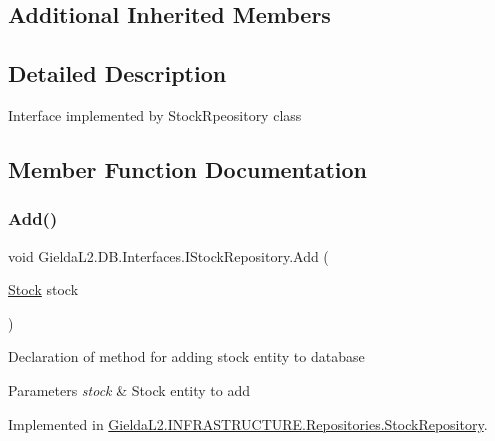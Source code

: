 \subsection*{Additional Inherited Members}


\subsection{Detailed Description}
Interface implemented by Stock\+Rpeository class 



\subsection{Member Function Documentation}
\mbox{\label{interface_gielda_l2_1_1_d_b_1_1_interfaces_1_1_i_stock_repository_a602e2dcb80b5c6e13e2db9ff57afa96b}} 
\subsubsection{\texorpdfstring{Add()}{Add()}}
{\footnotesize\ttfamily void Gielda\+L2.\+D\+B.\+Interfaces.\+I\+Stock\+Repository.\+Add (\begin{DoxyParamCaption}\item[{\mbox{\hyperlink{class_gielda_l2_1_1_d_b_1_1_entities_1_1_stock}{Stock}}}]{stock }\end{DoxyParamCaption})}



Declaration of method for adding stock entity to database 


\begin{DoxyParams}{Parameters}
{\em stock} & Stock entity to add\\
\hline
\end{DoxyParams}


Implemented in \mbox{\hyperlink{class_gielda_l2_1_1_i_n_f_r_a_s_t_r_u_c_t_u_r_e_1_1_repositories_1_1_stock_repository_a156b8b54cd523f36d5a5e82a0d7532ec}{Gielda\+L2.\+I\+N\+F\+R\+A\+S\+T\+R\+U\+C\+T\+U\+R\+E.\+Repositories.\+Stock\+Repository}}.

\mbox{\label{interface_gielda_l2_1_1_d_b_1_1_interfaces_1_1_i_stock_repository_aa24bb25092f2082b4bdf0d5744e3127f}} 
